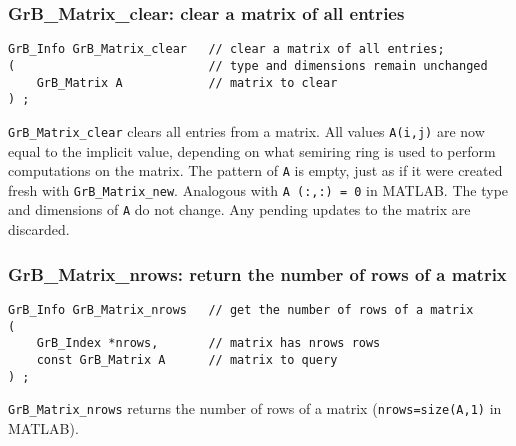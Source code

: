 \documentclass[12pt]{article}
\begin{document}
\subsubsection{{\sf GrB\_Matrix\_clear:}        clear a matrix of all entries}
\label{matrix_clear}

\begin{mdframed}[userdefinedwidth=6in]
{\footnotesize
\begin{verbatim}
GrB_Info GrB_Matrix_clear   // clear a matrix of all entries;
(                           // type and dimensions remain unchanged
    GrB_Matrix A            // matrix to clear
) ;
\end{verbatim} } \end{mdframed}

\verb'GrB_Matrix_clear' clears all entries from a matrix.  All values
\verb'A(i,j)' are now equal to the implicit value, depending on what semiring
ring is used to perform computations on the matrix.  The pattern of \verb'A' is
empty, just as if it were created fresh with \verb'GrB_Matrix_new'.  Analogous
with \verb'A (:,:) = 0' in MATLAB.  The type and dimensions of \verb'A' do not
change.  Any pending updates to the matrix are discarded.

\subsubsection{{\sf GrB\_Matrix\_nrows:}        return the number of rows of a matrix}
\label{matrix_nrows}

\begin{mdframed}[userdefinedwidth=6in]
{\footnotesize
\begin{verbatim}
GrB_Info GrB_Matrix_nrows   // get the number of rows of a matrix
(
    GrB_Index *nrows,       // matrix has nrows rows
    const GrB_Matrix A      // matrix to query
) ;
\end{verbatim} } \end{mdframed}

\verb'GrB_Matrix_nrows' returns the number of rows of a matrix
(\verb'nrows=size(A,1)' in MATLAB).

\end{document}
